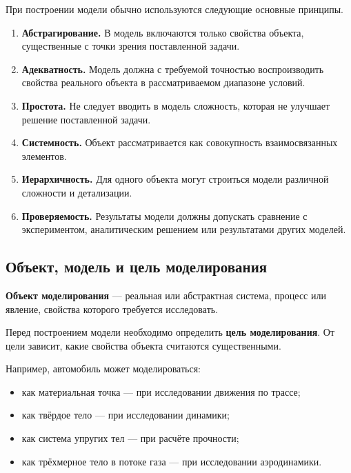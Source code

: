При построении модели обычно используются следующие основные принципы.

\begin{enumerate}
	\item \textbf{Абстрагирование.}
	В модель включаются только свойства объекта, существенные с точки зрения
	поставленной задачи.
	
	\item \textbf{Адекватность.}
	Модель должна с требуемой точностью воспроизводить свойства реального объекта
	в рассматриваемом диапазоне условий.
	
	\item \textbf{Простота.}
	Не следует вводить в модель сложность, которая не улучшает решение
	поставленной задачи.
	
	\item \textbf{Системность.}
	Объект рассматривается как совокупность взаимосвязанных элементов.
	
	\item \textbf{Иерархичность.}
	Для одного объекта могут строиться модели различной сложности и детализации.
	
	\item \textbf{Проверяемость.}
	Результаты модели должны допускать сравнение с экспериментом,
	аналитическим решением или результатами других моделей.
\end{enumerate}


\subsection{Объект, модель и цель моделирования}

\textbf{Объект моделирования} --- реальная или абстрактная система,
процесс или явление, свойства которого требуется исследовать.

Перед построением модели необходимо определить \textbf{цель моделирования}.
От цели зависит, какие свойства объекта считаются существенными.

Например, автомобиль может моделироваться:
\begin{itemize}
	\item как материальная точка --- при исследовании движения по трассе;
	\item как твёрдое тело --- при исследовании динамики;
	\item как система упругих тел --- при расчёте прочности;
	\item как трёхмерное тело в потоке газа --- при исследовании аэродинамики.
\end{itemize}

